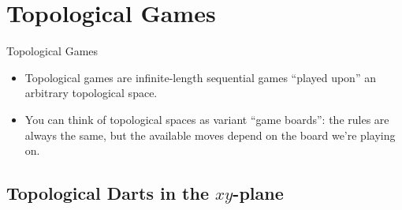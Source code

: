 \documentclass{beamer}
\begin{document}

\section{Topological Games}

\begin{frame}{Topological Games}
  
  \begin{itemize}
    \item
      Topological games are infinite-length sequential games ``played upon'' an arbitrary topological space.
    \pause
    \item
      You can think of topological spaces as variant ``game boards'': the rules are always the same, but the available moves depend on the board we're playing on.
  \end{itemize}

\end{frame}

\subsection{Topological Darts in the $xy$-plane}
\end{document}
